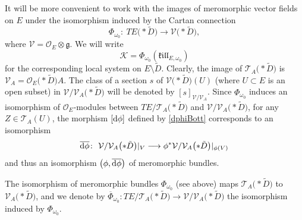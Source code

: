 \documentclass[10pt,a4paper]{amsart}
\numberwithin{equation}{section}
\begin{document}
It will be more convenient to work with the images of meromorphic vector fields on $E$ under the isomorphism induced by the Cartan connection
 \begin{equation}\label{Phi}\Phi_{\omega_0}\colon\ TE\bigl(* \tilde{D}\bigr) \longrightarrow \mathcal{V}\bigl(* \tilde{D}\bigr),
 \end{equation}
 where $\mathcal{V}=\mathcal{O}_E\otimes \mathfrak{g}$. We will write
 \begin{equation}\label{K} \mathcal{K} = \Phi_{\omega_0}(\mathfrak{k}\mathfrak{i}\mathfrak{l}\mathfrak{l}_{E,\omega_0}) \end{equation}
 for the corresponding local system on $E\setminus \tilde{D}$. Clearly, the image of $\mathcal{T}_A\bigl(* \tilde{D}\bigr)$ is $\mathcal{V}_A=\mathcal{O}_E\bigl(* \tilde{D}\bigr) A$. The class of a section $s$ of $\mathcal{V}\bigl(* \tilde{D}\bigr)(U)$ (where $U\subset E$ is an open subset) in $\mathcal{V}/\mathcal{V}_A\bigl(* \tilde{D}\bigr)$ will be denoted by $[s]_{\mathcal{V}/\mathcal{V}_A}$. Since $\Phi_{\omega_0}$ induces an isomorphism of $\mathcal{O}_E$-modules between $TE/\mathcal{T}_A\bigl(* \tilde{D}\bigr)$ and $\mathcal{V}/\mathcal{V}_A\bigl(* \tilde{D}\bigr)$, for any $Z\in \mathcal{T}_A(U)$, the morphism $[{\rm d}\phi]$ defined by \eqref{dphiBott} corresponds to an isomorphism
 \begin{gather}\label{dphibarBott}\overline{{\rm d}\phi}\colon\ \mathcal{V}/\mathcal{V}_A\bigl(* \tilde{D}\bigr)\vert_V \longrightarrow \phi^* \mathcal{V}/\mathcal{V}_A\bigl(* \tilde{D}\bigr)\vert_{\phi(V)}
 \end{gather}
 and thus an isomorphism $\big(\phi,\overline{{\rm d}\phi}\big)$ of meromorphic bundles.

The isomorphism of meromorphic bundles $\Phi_{\omega_0}$ (see above) maps $\mathcal{T}_A\bigl(* \tilde{D}\bigr)$ to $\mathcal{V}_A\bigl(* \tilde{D}\bigr)$, and we denote by $\overline{\Phi}_{\omega_0}\colon TE/\mathcal{T}_A\bigl(* \tilde{D}\bigr) \longrightarrow \mathcal{V}/\mathcal{V}_A\bigl(* \tilde{D}\bigr)$ the isomorphism induced by $\Phi_{\omega_0}$. %
\end{document}
